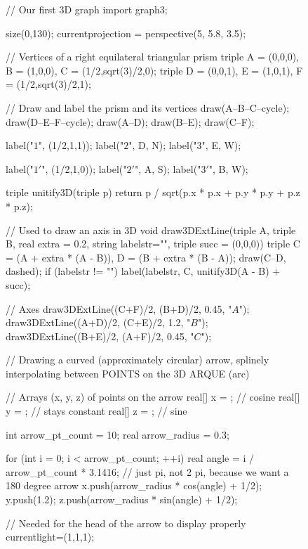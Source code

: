 \documentclass[../textbook.tex]{subfiles}
\begin{document}
\begin{figure}[h]
	\begin{center}
		\begin{minipage}[b]{\textwidth}
			\centering
			\begin{asy}[width=0.5\textwidth]
				// Our first 3D graph
				import graph3;

				size(0,130);
				currentprojection = perspective(5, 5.8, 3.5);

				// Vertices of a right equilateral triangular prism
				triple A = (0,0,0), B = (1,0,0), C = (1/2,sqrt(3)/2,0);
				triple D = (0,0,1), E = (1,0,1), F = (1/2,sqrt(3)/2,1);

				// Draw and label the prism and its vertices
				draw(A--B--C--cycle);
				draw(D--E--F--cycle);
				draw(A--D);
				draw(B--E);
				draw(C--F);

				label("$1$", (1/2,1,1));
				label("$2$", D, N);
				label("$3$", E, W);

				label("$1'$", (1/2,1,0));
				label("$2'$", A, S);
				label("$3'$", B, W);

				triple unitify3D(triple p) {
					return p / sqrt(p.x * p.x + p.y * p.y + p.z * p.z);
				}

				// Used to draw an axis in 3D
				void draw3DExtLine(triple A, triple B, real extra = 0.2, string labelstr="", triple succ = (0,0,0)) {
					triple C = (A + extra * (A - B)), D = (B + extra * (B - A));
					draw(C--D, dashed);
					if (labelstr != "") label(labelstr, C, unitify3D(A - B) + succ);
				}

				// Axes
				draw3DExtLine((C+F)/2, (B+D)/2, 0.45, "$A$");
				draw3DExtLine((A+D)/2, (C+E)/2, 1.2, "$B$");
				draw3DExtLine((B+E)/2, (A+F)/2, 0.45, "$C$");

				// Drawing a curved (approximately circular) arrow, splinely interpolating between POINTS on the 3D ARQUE (arc)

				// Arrays (x, y, z) of points on the arrow
				real[] x = {}; // cosine
				real[] y = {}; // stays constant
				real[] z = {}; // sine

				int arrow_pt_count = 10;
				real arrow_radius = 0.3;

				for (int i = 0; i < arrow_pt_count; ++i) {
					real angle = i / arrow_pt_count * 3.1416; // just pi, not 2 pi, because we want a 180 degree arrow
					x.push(arrow_radius * cos(angle) + 1/2);
					y.push(1.2);
					z.push(arrow_radius * sin(angle) + 1/2);
				}

				// Needed for the head of the arrow to display properly
				currentlight=(1,1,1);


\end{asy}
\end{minipage}
\end{center}
\end{figure}
\end{document}
